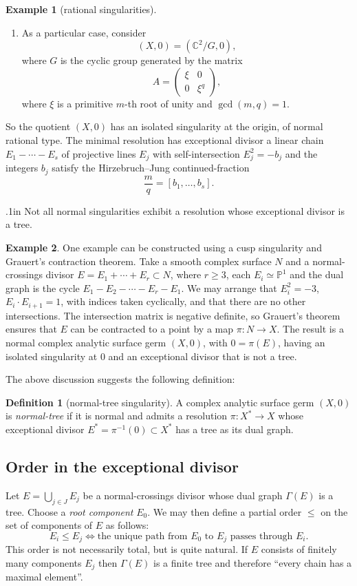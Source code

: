 \documentclass[11pt,twoside]{amsart}
\newcommand{\C}{\mathbb C}
\newcommand{\Pone}{\mathbb P^1}
\theoremstyle{definition}
\newtheorem{defi}{Definition}
\newtheorem{exe}{Example}
\begin{document}
\begin{exe}[rational singularities]
\begin{enumerate}
\item As a particular case, consider
\[
(X,0)=(\C^2/G,0),
\]
where $G$ is the cyclic group generated by the matrix
\[
A=\begin{pmatrix}\xi&0\\0&\xi^q\end{pmatrix},
\]
where $\xi$ is a primitive $m$-th root of unity and
$\gcd(m,q)=1$.
\end{enumerate}

So the quotient $(X,0)$ has an isolated singularity at the origin, of normal rational type. The minimal resolution has exceptional divisor a linear chain $E_1-\cdots-E_s$ of projective lines $E_j$ with self-intersection $E_j^2=-b_j$ and the integers $b_j$ satisfy the Hirzebruch--Jung continued-fraction
\[
\frac{m}{q}=[b_1,\ldots,b_s].
\]


\end{exe}
\vglue.1in
Not all normal singularities exhibit a resolution whose exceptional divisor is a tree.
\begin{exe}
One example can be constructed using a cusp singularity and Grauert's
contraction theorem. Take a smooth complex surface $N$ and a
normal-crossings divisor $E=E_1+\cdots+E_r\subset N$, where $r\geq3$, each
$E_i\simeq\Pone$ and the dual graph is the cycle
$E_1-E_2-\cdots-E_r-E_1$. We may arrange that
$E_i^2=-3$, $E_i\cdot E_{i+1}=1$,
with indices taken cyclically, and that there are no other intersections.
The intersection matrix is negative definite, so Grauert's theorem ensures
that $E$ can be contracted to a point by a map $\pi\colon N\to X$. The
result is a normal complex analytic surface germ $(X,0)$, with
$0=\pi(E)$, having an isolated singularity at $0$ and an exceptional
divisor that is not a tree.
\end{exe}
The above discussion suggests the following definition:

\begin{defi}[normal-tree singularity]
A complex analytic surface germ $(X,0)$ is \textit{normal-tree} if it is
normal and admits a resolution $\pi:X^*\to X$ whose exceptional divisor
$E^*=\pi^{-1}(0)\subset X^*$ has a tree as its dual graph.
\end{defi}

\subsection{Order in the exceptional divisor}

Let $E=\displaystyle\bigcup_{j\in J}E_j$
be a normal-crossings divisor whose dual graph $\Gamma(E)$ is a tree. Choose
a \textit{root component} $E_0$. We may then define a partial order $\leq$
on the set of components of $E$ as follows:
\[
E_i\leq E_j \Longleftrightarrow \text{the unique path from }E_0\text{ to }E_j\text{ passes through }E_i.
\]
This order is not necessarily total, but is quite natural. If $E$ consists of finitely many components $E_j$ then $\Gamma(E)$ is a finite tree and therefore ``every chain has a maximal element''.
\end{document}
